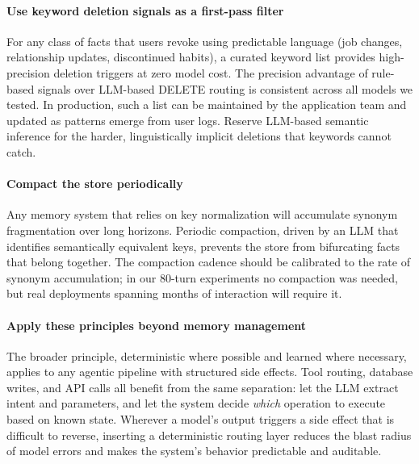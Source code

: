 \documentclass[10pt, twocolumn]{article}
\begin{document}
\paragraph{Use keyword deletion signals as a first-pass filter}
For any class of facts that users revoke using predictable language (job
changes, relationship updates, discontinued habits), a curated keyword
list provides high-precision deletion triggers at zero model cost.
The precision advantage of rule-based signals over LLM-based DELETE
routing is consistent across all models we tested. In production, such
a list can be maintained by the application team and updated as patterns
emerge from user logs. Reserve LLM-based semantic inference for the
harder, linguistically implicit deletions that keywords cannot catch.

\paragraph{Compact the store periodically}
Any memory system that relies on key normalization will accumulate synonym
fragmentation over long horizons. Periodic compaction, driven by an LLM
that identifies semantically equivalent keys, prevents the store from
bifurcating facts that belong together.
The compaction cadence should be calibrated to the rate of synonym
accumulation; in our 80-turn experiments no compaction was needed, but
real deployments spanning months of interaction will require it.

\paragraph{Apply these principles beyond memory management}
The broader principle, deterministic where possible and learned where
necessary, applies to any agentic pipeline with structured side effects.
Tool routing, database writes, and API calls all benefit from the same
separation: let the LLM extract intent and parameters, and let the system
decide \emph{which} operation to execute based on known state.
Wherever a model's output triggers a side effect that is difficult to
reverse, inserting a deterministic routing layer reduces the blast radius
of model errors and makes the system's behavior predictable and auditable.



\end{document}
